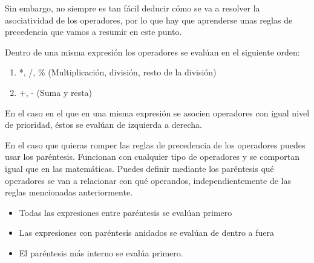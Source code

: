 Sin embargo, no siempre es tan fácil deducir cómo se va a resolver la asociatividad de los operadores, por lo que hay que aprenderse unas reglas de precedencia que vamos a resumir en este punto.

Dentro de una misma expresión los operadores se evalúan en el siguiente orden: 

\begin{enumerate}
	\item *, /, \% (Multiplicación, división, resto de la división) 
	\item +, - (Suma y resta) 
\end{enumerate}

En el caso en el que en una misma expresión se asocien operadores con igual nivel de prioridad, éstos se evalúan de izquierda a derecha. 

En el caso que quieras romper las reglas de precedencia de los operadores puedes usar los paréntesis. Funcionan con cualquier tipo de operadores y se comportan igual que en las matemáticas. Puedes definir mediante los paréntesis qué operadores se van a relacionar con qué operandos, independientemente de las reglas mencionadas anteriormente. 

\begin{itemize}
	\item Todas las expresiones entre paréntesis se evalúan primero
	\item Las expresiones con paréntesis anidados se evalúan de dentro a fuera
	\item El paréntesis más interno se evalúa primero.
\end{itemize}
